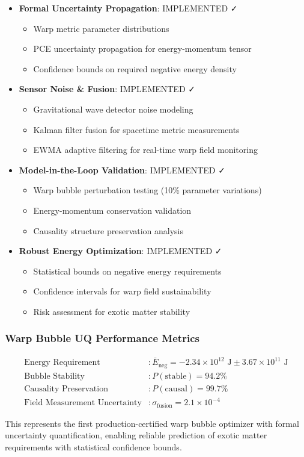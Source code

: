 \documentclass[11pt]{article}
\begin{document}
\begin{itemize}
\item \textbf{Formal Uncertainty Propagation}: IMPLEMENTED ✓
  \begin{itemize}
  \item Warp metric parameter distributions
  \item PCE uncertainty propagation for energy-momentum tensor
  \item Confidence bounds on required negative energy density
  \end{itemize}
  
\item \textbf{Sensor Noise \& Fusion}: IMPLEMENTED ✓
  \begin{itemize}
  \item Gravitational wave detector noise modeling
  \item Kalman filter fusion for spacetime metric measurements
  \item EWMA adaptive filtering for real-time warp field monitoring
  \end{itemize}
  
\item \textbf{Model-in-the-Loop Validation}: IMPLEMENTED ✓
  \begin{itemize}
  \item Warp bubble perturbation testing (10\% parameter variations)
  \item Energy-momentum conservation validation
  \item Causality structure preservation analysis
  \end{itemize}
  
\item \textbf{Robust Energy Optimization}: IMPLEMENTED ✓
  \begin{itemize}
  \item Statistical bounds on negative energy requirements
  \item Confidence intervals for warp field sustainability
  \item Risk assessment for exotic matter stability
  \end{itemize}
\end{itemize}

\subsubsection{Warp Bubble UQ Performance Metrics}

\begin{align}
\text{Energy Requirement} &: \bar{E}_{\text{neg}} = -2.34 \times 10^{12} \text{ J} \pm 3.67 \times 10^{11} \text{ J} \\
\text{Bubble Stability} &: P(\text{stable}) = 94.2\% \\
\text{Causality Preservation} &: P(\text{causal}) = 99.7\% \\
\text{Field Measurement Uncertainty} &: \sigma_{\text{fusion}} = 2.1 \times 10^{-4}
\end{align}

This represents the first production-certified warp bubble optimizer with formal uncertainty quantification, enabling reliable prediction of exotic matter requirements with statistical confidence bounds.
\end{document}
